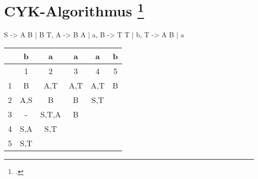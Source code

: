\documentclass{lehramt-informatik-aufgabe}
\begin{document}
\section{CYK-Algorithmus
\footcite[Seite 46]{theo:fs:2}}

\begin{liProduktionsRegeln}
S -> A B | B T,
A -> B A | a,
B -> T T | b,
T -> A B | a
\end{liProduktionsRegeln}

\begin{liAntwort}
\begin{tabular}{r|c|c|c|c|c|}
  &  b   & a     & a   & a   & b \\\hline\hline
  & 1    & 2     & 3   & 4   & 5 \\\hline
1 & B   & A,T   & A,T & A,T & B \\
2 & A,S & B     & B   & S,T \\
3 & -   & S,T,A & B \\
4 & S,A & S,T \\
5 & S,T \\
\end{tabular}
\end{liAntwort}
\end{document}
